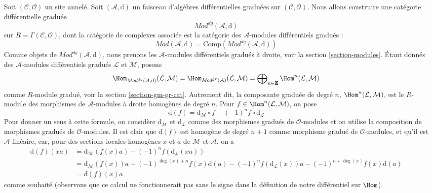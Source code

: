 \medskip\noindent
Soit $(\mathcal{C}, \mathcal{O})$ un site annelé. Soit
$(\mathcal{A}, \text{d})$ un faisceau d'algèbres différentielles graduées sur
$(\mathcal{C}, \mathcal{O})$. Nous allons construire une
catégorie différentielle graduée
$$
\textit{Mod}^{dg}(\mathcal{A}, \text{d})
$$
sur $R = \Gamma(\mathcal{C}, \mathcal{O})$, dont la catégorie de complexes
associée est la catégorie des $\mathcal{A}$-modules différentiels gradués :
$$
\textit{Mod}(\mathcal{A}, \text{d}) =
\text{Comp}(\textit{Mod}^{dg}(\mathcal{A}, \text{d}))
$$ Comme objets
de $\textit{Mod}^{dg}(\mathcal{A}, \text{d})$, nous prenons les
$\mathcal{A}$-modules différentiels gradués à droite, voir
la section \ref{section-modules}. Étant donnés des
$\mathcal{A}$-modules différentiels gradués $\mathcal{L}$ et $\mathcal{M}$,
posons $$
\Hom_{\textit{Mod}^{dg}(\mathcal{A}, \text{d})}(\mathcal{L}, \mathcal{M})
= \Hom_{\textit{Mod}^{gr}(\mathcal{A})}(\mathcal{L}, \mathcal{M}) =
\bigoplus\nolimits_{n \in \mathbf{Z}} \Hom^n(\mathcal{L}, \mathcal{M})
$$ comme
$R$-module gradué, voir la section \ref{section-gm-gr-cat}. Autrement
dit, la composante graduée de degré $n$,
$\Hom^n(\mathcal{L}, \mathcal{M})$, est le $R$-module des morphismes
de $\mathcal{A}$-modules à droite homogènes de degré $n$.
Pour $f \in \Hom^n(\mathcal{L}, \mathcal{M})$, on pose
$$
\text{d}(f) =
\text{d}_\mathcal{M} \circ f - (-1)^n f \circ \text{d}_\mathcal{L}
$$ Pour donner
un sens à cette formule, on considère $\text{d}_\mathcal{M}$ et
$\text{d}_\mathcal{L}$ comme des morphismes gradués de $\mathcal{O}$-modules
et on utilise la composition de morphismes gradués de $\mathcal{O}$-modules.
Il est clair que $\text{d}(f)$
est homogène de degré $n + 1$ comme morphisme gradué de $\mathcal{O}$-modules,
et qu'il est $\mathcal{A}$-linéaire, car, pour des sections locales homogènes $x$ et $a$
de $\mathcal{M}$ et $\mathcal{A}$,
on a \begin{align*}
\text{d}(f)(xa)
&
= \text{d}_\mathcal{M}(f(x) a) - (-1)^n f (\text{d}_\mathcal{L}(xa)) \\
&
= \text{d}_\mathcal{M}(f(x)) a + (-1)^{\deg(x) + n} f(x) \text{d}(a)
- (-1)^n f(\text{d}_\mathcal{L}(x)) a - (-1)^{n + \deg(x)} f(x) \text{d}(a) \\
& = \text{d}(f)(x)
a \end{align*}
comme souhaité (observons que ce calcul ne fonctionnerait pas sans le
signe dans la définition de notre différentiel sur $\Hom$).

